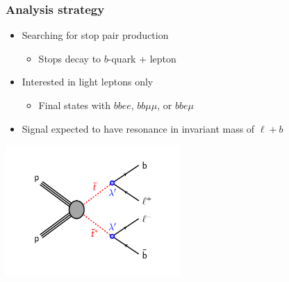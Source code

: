 \documentclass[10pt, svgnames]{beamer}
\begin{document}
\begin{frame}
  \frametitle{Analysis strategy}
  \begin{itemize}
    \item Searching for stop pair production
      \begin{itemize}
        \item Stops decay to
          {\color{nice_red} $b$-quark + lepton }
      \end{itemize}
    \item Interested in light leptons only
      \begin{itemize}
        \item Final states with
          {\color{nice_blue} $bbee$},
          {\color{nice_blue} $bb\mu\mu$}, or
          {\color{nice_blue} $bbe\mu$}
      \end{itemize}
    \item Signal expected to have resonance in invariant mass of
      $\ell+b$
  \end{itemize}
  \begin{center}
    \includegraphics[width=0.5\textwidth]{figures/b_minus_l_stop_stop.pdf}
  \end{center}
\end{frame}
\end{document}
